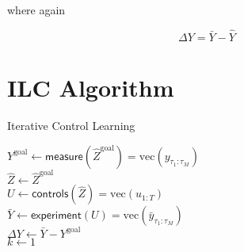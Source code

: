 \documentclass{article}
\begin{document}
where again

$$
\Delta Y = \bar Y - \hat Y
$$

\newpage

\section*{ILC Algorithm}

\begin{algorithm}
  \caption{Iterative Control Learning}
  $Y^\text{goal} \gets \textsf{measure}(\hat Z^\text{goal}) = \text{vec}(y_{\tau_1:\tau_M})$\\
  $\hat Z \gets \hat Z^\text{goal}$\\
  $U \gets \textsf{controls}(\hat Z) = \text{vec}(u_{1:T})$ \\
  $\bar Y \gets \textsf{experiment}(U) = \text{vec}(\bar y_{\tau_1:\tau_M})$\\
  $\Delta Y \gets \bar Y - Y^\text{goal}$ \\
  $k \gets 1$\\
\end{algorithm}


 
\end{document}
